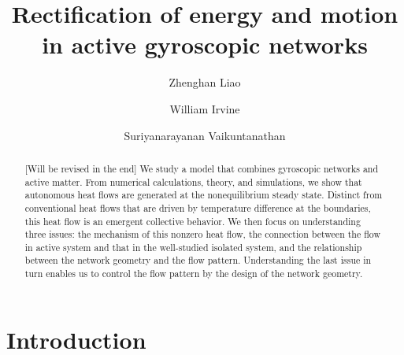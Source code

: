 \documentclass[
 preprint,
 preprintnumbers,
 amsmath,amssymb,
 aps,
 pre,
 longbibliography,
 superscriptaddress,
 10pt, twocolumn
]{revtex4-1}
\begin{document}
\newcommand{\eqnname}{Eqn.}
\newcommand{\secname}{Sec.}


\title{Rectification of energy and motion in active gyroscopic networks}


\author{Zhenghan Liao}
\author{William Irvine}
\author{Suriyanarayanan Vaikuntanathan}


\begin{abstract}
[Will be revised in the end] We study a model that combines gyroscopic networks and active matter. From numerical calculations, theory, and simulations, we show that autonomous heat flows are generated at the nonequilibrium steady state. Distinct from conventional heat flows that are driven by temperature difference at the boundaries, this heat flow is an emergent collective behavior.
We then focus on understanding three issues: the mechanism of this nonzero heat flow, the connection between the flow in active system and that in the well-studied isolated system, and the relationship between the network geometry and the flow pattern.
Understanding the last issue in turn enables us to control the flow pattern by the design of the network geometry.
\end{abstract}

\maketitle

\section{Introduction} \label{sec:intro}

\end{document}
